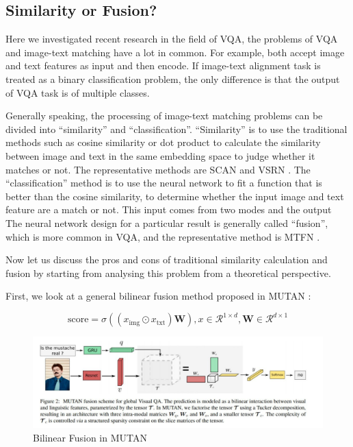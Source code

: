 \subsection{Similarity or Fusion?}
Here we investigated recent research in the field of VQA, the problems of VQA and image-text matching have a lot in common. For example, both accept image and text features as input and then encode. If image-text alignment task is treated as a binary classification problem, the only difference is that the output of VQA task is of multiple classes.

Generally speaking, the processing of image-text matching problems can be divided into ``similarity'' and ``classification''. ``Similarity'' is to use the traditional methods such as cosine similarity or dot product to calculate the similarity between image and text in the same embedding space to judge whether it matches or not. The representative methods are SCAN \cite{scan} and VSRN \cite{VSRN}. The ``classification'' method is to use the neural network to fit a function that is better than the cosine similarity, to determine whether the input image and text feature are a match or not. This input comes from two modes and the output The neural network design for a particular result is generally called ``fusion'', which is more common in VQA, and the representative method is MTFN \cite{MTFN}.

Now let us discuss the pros and cons of traditional similarity calculation and fusion by starting from analysing this problem from a theoretical perspective.

First, we look at a general bilinear fusion method proposed in MUTAN \cite{benyounes2017mutan}:

$$
\text {score}=\sigma\left(\left(x_{\text {img}} \odot x_{\text {txt}}\right) \mathbf{W}\right), x \in \mathcal{R}^{1 \times d}, \mathbf{W} \in \mathcal{R}^{d \times 1}
$$

\begin{figure}[h!]
\centering
\includegraphics[width=\textwidth]{MUTAN.pdf}
\caption{Bilinear Fusion in MUTAN \cite{benyounes2017mutan}}
\label{fig:mutan}
\end{figure}

